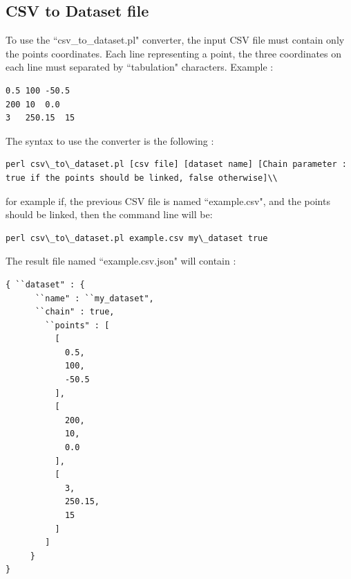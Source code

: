 \documentclass{bioinfo}
\begin{document}
\subsection{CSV to Dataset file}
To use the ``csv\_to\_dataset.pl" converter, the input CSV file must contain only the points coordinates. Each line representing a point, the three coordinates on each line must separated by ``tabulation" characters. Example :
\begin{lstlisting}
0.5	100	-50.5
200	10	0.0
3	250.15	15
\end{lstlisting}
The syntax to use the converter is the following :
\begin{lstlisting}
perl csv\_to\_dataset.pl [csv file] [dataset name] [Chain parameter : true if the points should be linked, false otherwise]\\
\end{lstlisting}
for example if, the previous CSV file is named ``example.csv", and the points should be linked, then the command line will be:
\begin{lstlisting}
perl csv\_to\_dataset.pl example.csv my\_dataset true
\end{lstlisting}
The result file named ``example.csv.json" will contain :
\begin{lstlisting}
{ ``dataset" : {
      ``name" : ``my_dataset",
      ``chain" : true,
        ``points" : [
          [
            0.5,
            100,
            -50.5
          ],
          [
            200,
            10,
            0.0
          ],
          [
            3,
            250.15,
            15
          ]
        ]
     }
}
\end{lstlisting}
\end{document}
